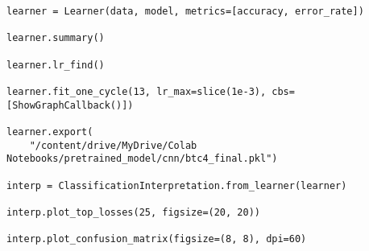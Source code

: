 \begin{verbatim}
learner = Learner(data, model, metrics=[accuracy, error_rate])

learner.summary()

learner.lr_find()

learner.fit_one_cycle(13, lr_max=slice(1e-3), cbs=[ShowGraphCallback()])

learner.export(
    "/content/drive/MyDrive/Colab Notebooks/pretrained_model/cnn/btc4_final.pkl")

interp = ClassificationInterpretation.from_learner(learner)

interp.plot_top_losses(25, figsize=(20, 20))

interp.plot_confusion_matrix(figsize=(8, 8), dpi=60)
\end{verbatim}

